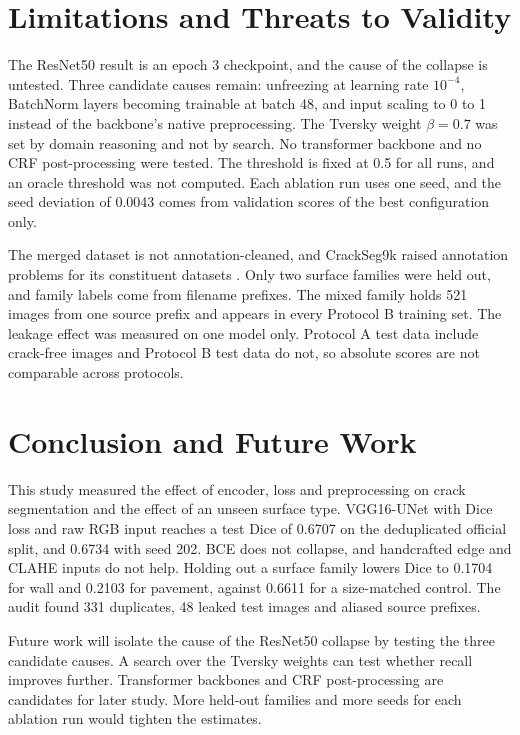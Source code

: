 \documentclass[conference]{IEEEtran}
\begin{document}
\section{Limitations and Threats to Validity}
\label{sec:limits}
The ResNet50 result is an epoch 3 checkpoint, and the cause of the collapse is untested. Three candidate causes remain: unfreezing at learning rate $10^{-4}$, BatchNorm layers becoming trainable at batch 48, and input scaling to 0 to 1 instead of the backbone's native preprocessing. The Tversky weight $\beta=0.7$ was set by domain reasoning and not by search. No transformer backbone and no CRF post-processing were tested. The threshold is fixed at 0.5 for all runs, and an oracle threshold was not computed. Each ablation run uses one seed, and the seed deviation of 0.0043 comes from validation scores of the best configuration only.

The merged dataset is not annotation-cleaned, and CrackSeg9k raised annotation problems for its constituent datasets \cite{crackseg9k}. Only two surface families were held out, and family labels come from filename prefixes. The mixed family holds 521 images from one source prefix and appears in every Protocol B training set. The leakage effect was measured on one model only. Protocol A test data include crack-free images and Protocol B test data do not, so absolute scores are not comparable across protocols.

\section{Conclusion and Future Work}
\label{sec:conclusion}
This study measured the effect of encoder, loss and preprocessing on crack segmentation and the effect of an unseen surface type. VGG16-UNet with Dice loss and raw RGB input reaches a test Dice of 0.6707 on the deduplicated official split, and 0.6734 with seed 202. BCE does not collapse, and handcrafted edge and CLAHE inputs do not help. Holding out a surface family lowers Dice to 0.1704 for wall and 0.2103 for pavement, against 0.6611 for a size-matched control. The audit found 331 duplicates, 48 leaked test images and aliased source prefixes.

Future work will isolate the cause of the ResNet50 collapse by testing the three candidate causes. A search over the Tversky weights can test whether recall improves further. Transformer backbones and CRF post-processing are candidates for later study. More held-out families and more seeds for each ablation run would tighten the estimates.
\end{document}
